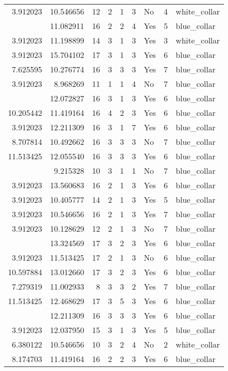 \documentclass[
]{article}
\begin{document}
\begin{longtable}[t]{rrrrrllrl}
3.912023 & 10.546656 & 12 & 2 & 1 & 3 & No & 4 & white\_collar\\
\addlinespace
8.281471 & 11.082911 & 16 & 2 & 2 & 4 & Yes & 5 & blue\_collar\\
3.912023 & 11.198899 & 14 & 3 & 1 & 3 & Yes & 3 & white\_collar\\
3.912023 & 15.704102 & 17 & 3 & 1 & 3 & Yes & 6 & blue\_collar\\
7.625595 & 10.276774 & 16 & 3 & 3 & 3 & Yes & 7 & blue\_collar\\
3.912023 & 8.968269 & 11 & 1 & 1 & 4 & No & 7 & blue\_collar\\
\addlinespace
3.912023 & 12.072827 & 16 & 3 & 1 & 3 & Yes & 6 & blue\_collar\\
10.205442 & 11.419164 & 16 & 4 & 2 & 3 & Yes & 6 & blue\_collar\\
3.912023 & 12.211309 & 16 & 3 & 1 & 7 & Yes & 6 & blue\_collar\\
8.707814 & 10.492662 & 16 & 3 & 3 & 3 & No & 7 & blue\_collar\\
11.513425 & 12.055540 & 16 & 3 & 3 & 3 & Yes & 6 & blue\_collar\\
\addlinespace
3.912023 & 9.215328 & 10 & 3 & 1 & 1 & No & 7 & blue\_collar\\
3.912023 & 13.560683 & 16 & 2 & 1 & 3 & Yes & 6 & blue\_collar\\
3.912023 & 10.405777 & 14 & 2 & 1 & 3 & Yes & 5 & blue\_collar\\
3.912023 & 10.546656 & 16 & 2 & 1 & 3 & Yes & 7 & blue\_collar\\
3.912023 & 10.128629 & 12 & 2 & 1 & 3 & No & 7 & blue\_collar\\
\addlinespace
10.597884 & 13.324569 & 17 & 3 & 2 & 3 & Yes & 6 & blue\_collar\\
3.912023 & 11.513425 & 17 & 2 & 1 & 3 & No & 6 & blue\_collar\\
10.597884 & 13.012660 & 17 & 3 & 2 & 3 & Yes & 6 & blue\_collar\\
7.279319 & 11.002933 & 8 & 3 & 3 & 2 & Yes & 7 & blue\_collar\\
11.513425 & 12.468629 & 17 & 3 & 5 & 3 & Yes & 6 & blue\_collar\\
\addlinespace
6.956545 & 12.211309 & 16 & 3 & 3 & 3 & Yes & 6 & blue\_collar\\
3.912023 & 12.037950 & 15 & 3 & 1 & 3 & Yes & 5 & blue\_collar\\
6.380122 & 10.546656 & 10 & 3 & 2 & 4 & No & 2 & white\_collar\\
8.174703 & 11.419164 & 16 & 2 & 2 & 3 & Yes & 6 & blue\_collar\\

\end{longtable}
\end{document}
